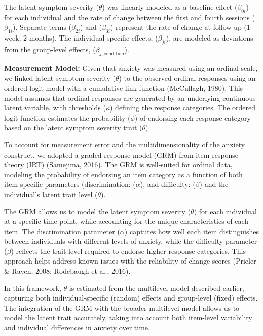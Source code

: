 \documentclass[
  man,floatsintext]{apa7}
\begin{document}
The latent symptom severity (\(\theta\)) was linearly modeled as a baseline effect (\(\beta_{0i}\)) for each individual and the rate of change between the first and fourth sessions (\(\beta_{1i}\)).
Separate terms (\(\beta_{2i}\)) and (\(\beta_{3i}\)) represent the rate of change at follow-up (1 week, 2 months).
The individual-specific effects, (\(\beta_{ji}\)), are modeled as deviations from the group-level effects, (\(\bar{\beta}_{j,\text{condition}}\)).

\textbf{Measurement Model:} Given that anxiety was measured using an ordinal scale, we linked latent symptom severity (\(\theta\)) to the observed ordinal responses using an ordered logit model with a cumulative link function (McCullagh, 1980).
This model assumes that ordinal responses are generated by an underlying continuous latent variable, with thresholds (\(\kappa\)) defining the response categories.
The ordered logit function estimates the probability (\(\phi\)) of endorsing each response category based on the latent symptom severity trait (\(\theta\)).

To account for measurement error and the multidimensionality of the anxiety construct, we adopted a graded response model (GRM) from item response theory (IRT) (Samejima, 2016).
The GRM is well-suited for ordinal data, modeling the probability of endorsing an item category as a function of both item-specific parameters (discrimination: (\(\alpha\)), and difficulty: (\(\beta\)) and the individual's latent trait level (\(\theta\)).

The GRM allows us to model the latent symptom severity (\(\theta\)) for each individual at a specific time point, while accounting for the unique characteristics of each item.
The discrimination parameter (\(\alpha\)) captures how well each item distinguishes between individuals with different levels of anxiety, while the difficulty parameter (\(\beta\)) reflects the trait level required to endorse higher response categories.
This approach helps address known issues with the reliability of change scores (Prieler \& Raven, 2008; Rodebaugh et al., 2016).

In this framework, \(\theta\) is estimated from the multilevel model described earlier, capturing both individual-specific (random) effects and group-level (fixed) effects.
The integration of the GRM with the broader multilevel model allows us to model the latent trait accurately, taking into account both item-level variability and individual differences in anxiety over time.
\end{document}
